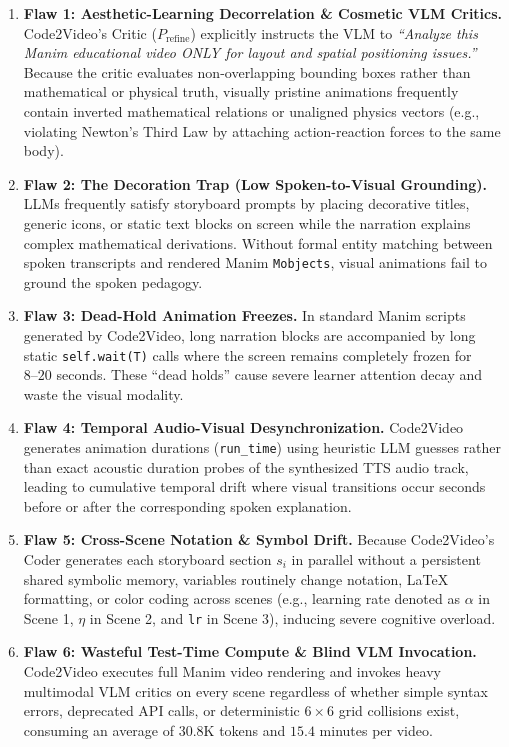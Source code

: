 \documentclass[11pt, a4paper]{article}
\begin{document}
\begin{enumerate}[leftmargin=*]
    \item \textbf{Flaw 1: Aesthetic-Learning Decorrelation \& Cosmetic VLM Critics.} Code2Video's Critic ($P_{\text{refine}}$) explicitly instructs the VLM to \textit{``Analyze this Manim educational video ONLY for layout and spatial positioning issues.''} Because the critic evaluates non-overlapping bounding boxes rather than mathematical or physical truth, visually pristine animations frequently contain inverted mathematical relations or unaligned physics vectors (e.g., violating Newton's Third Law by attaching action-reaction forces to the same body).
    \item \textbf{Flaw 2: The Decoration Trap (Low Spoken-to-Visual Grounding).} LLMs frequently satisfy storyboard prompts by placing decorative titles, generic icons, or static text blocks on screen while the narration explains complex mathematical derivations. Without formal entity matching between spoken transcripts and rendered Manim \texttt{Mobjects}, visual animations fail to ground the spoken pedagogy.
    \item \textbf{Flaw 3: Dead-Hold Animation Freezes.} In standard Manim scripts generated by Code2Video, long narration blocks are accompanied by long static \texttt{self.wait(T)} calls where the screen remains completely frozen for $8\text{--}20$ seconds. These ``dead holds'' cause severe learner attention decay and waste the visual modality.
    \item \textbf{Flaw 4: Temporal Audio-Visual Desynchronization.} Code2Video generates animation durations (\texttt{run\_time}) using heuristic LLM guesses rather than exact acoustic duration probes of the synthesized TTS audio track, leading to cumulative temporal drift where visual transitions occur seconds before or after the corresponding spoken explanation.
    \item \textbf{Flaw 5: Cross-Scene Notation \& Symbol Drift.} Because Code2Video's Coder generates each storyboard section $s_i$ in parallel without a persistent shared symbolic memory, variables routinely change notation, \LaTeX{} formatting, or color coding across scenes (e.g., learning rate denoted as $\alpha$ in Scene 1, $\eta$ in Scene 2, and \texttt{lr} in Scene 3), inducing severe cognitive overload.
    \item \textbf{Flaw 6: Wasteful Test-Time Compute \& Blind VLM Invocation.} Code2Video executes full Manim video rendering and invokes heavy multimodal VLM critics on every scene regardless of whether simple syntax errors, deprecated API calls, or deterministic $6\times 6$ grid collisions exist, consuming an average of $30.8\text{K}$ tokens and $15.4$ minutes per video.

\end{enumerate}
\end{document}
